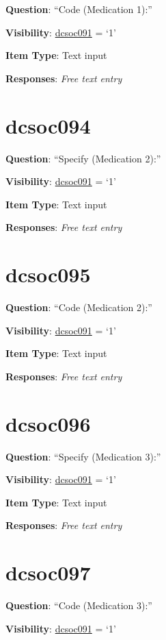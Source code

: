 \documentclass[]{book}
\begin{document}
\textbf{Question}: ``Code (Medication 1):''

\textbf{Visibility}: \protect\hyperlink{dcsoc091}{dcsoc091} = `1'

\textbf{Item Type}: Text input

\textbf{Responses}: \emph{Free text entry}

\hypertarget{dcsoc094}{%
\section{dcsoc094}\label{dcsoc094}}

\textbf{Question}: ``Specify (Medication 2):''

\textbf{Visibility}: \protect\hyperlink{dcsoc091}{dcsoc091} = `1'

\textbf{Item Type}: Text input

\textbf{Responses}: \emph{Free text entry}

\hypertarget{dcsoc095}{%
\section{dcsoc095}\label{dcsoc095}}

\textbf{Question}: ``Code (Medication 2):''

\textbf{Visibility}: \protect\hyperlink{dcsoc091}{dcsoc091} = `1'

\textbf{Item Type}: Text input

\textbf{Responses}: \emph{Free text entry}

\hypertarget{dcsoc096}{%
\section{dcsoc096}\label{dcsoc096}}

\textbf{Question}: ``Specify (Medication 3):''

\textbf{Visibility}: \protect\hyperlink{dcsoc091}{dcsoc091} = `1'

\textbf{Item Type}: Text input

\textbf{Responses}: \emph{Free text entry}

\hypertarget{dcsoc097}{%
\section{dcsoc097}\label{dcsoc097}}

\textbf{Question}: ``Code (Medication 3):''

\textbf{Visibility}: \protect\hyperlink{dcsoc091}{dcsoc091} = `1'
\end{document}
